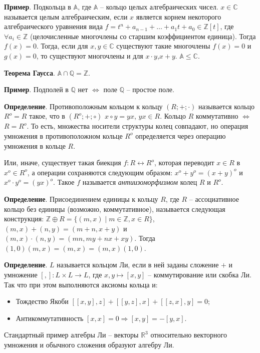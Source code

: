 \documentclass[a4paper]{book}
\begin{document}
\textbf{Пример}. Подкольца в $\mathbb{A}$, где $\mathbb{A}$ -- кольцо целых алгебраических чисел. $x\in\mathbb{C}$ называется целым алгебраическим, если $x$ является корнем некоторого алгебраического уравнения вида $f = t^n + a_{n-1} +\dots + a_1 t + a_0\in \mathbb{Z}[t]$, где $\forall a_i\in\mathbb{Z}$ (целочисленные многочлены со старшим коэффициентом единица). Тогда $f(x) = 0$. Тогда, если для $x,y\in \mathbb{C}$ существуют такие многочлены $f(x) = 0$ и $g(x) = 0$, то существуют многочлены и для $x\cdot y$,$x+y$. $\mathbb{A} \leqslant \mathbb{C}$. 


\textbf{Теорема Гаусса}. $\mathbb{A} \cap \mathbb{Q} = \mathbb{Z}$. 

\textbf{Пример}. Подполей в $\mathbb{Q}$ нет $\Leftrightarrow$ поле $\mathbb{Q}$ -- простое поле. 

\textbf{Определение}. Противоположным кольцом к кольцу $(R;+;\cdot)$ называется кольцо $R^o = R$ такое, что в $(R^o;+;\circ)$ $x\circ y = yx$, $yx\in R$. Кольцо $R$ коммутативно $\Leftrightarrow$ $R=R^o$. То есть, множества носители структуры колец совпадают, но операция умножения в противоположном кольце $R^o$ определяется через операцию умножения в кольце $R$. 

Или, иначе, существует такая биекция $f:R\leftrightarrow R^o$, которая переводит $x\in R$ в $x^o\in R^o$, а операции сохраняются следующим образом: $x^o +y^o = (x+y)^o$ и $x^o \cdot y^o = (yx)^o$. Такое $f$ называется \textit{антиизоморфизмом} колец $R$ и $R^o$. 

\textbf{Определение}. Присоединением единицы к кольцу $R$, где $R$ -- ассоциативное кольцо без единицы (возможно, коммутативное), называется следующая конструкция:
$\mathbb{Z}\oplus R = \{(m,x)\mid m\in\mathbb{Z}, x\in R\}$, $(m,x)+(n,y) = (m+n,x+y)$ и $(m,x)\cdot(n,y) = (mn,my+nx+xy)$. Тогда $(1,0) (m,x) = (m,x) = (m,x)(1,0)$. 

\textbf{Определение}. $L$ называется кольцом Ли, если в ней заданы сложение $+$ и умножение $[,]:L\times L\rightarrow L$, где $x,y \mapsto [x,y]$ -- коммутирование или скобка Ли. Так что при этом выполняются аксиомы кольца и:
\begin{itemize}
	\item  Тождество Якоби $[[x,y],z] + [[y,z],x] + [[z,x],y] = 0$;
	\item Антикоммутативность $[x,x] = 0 \Rightarrow [x,y] = -[y,x]$. 
\end{itemize}

Стандартный пример алгебры Ли -- векторы $\mathbb{R}^3$ относительно векторного умножения и обычного сложения образуют алгебру Ли. 
\end{document}
